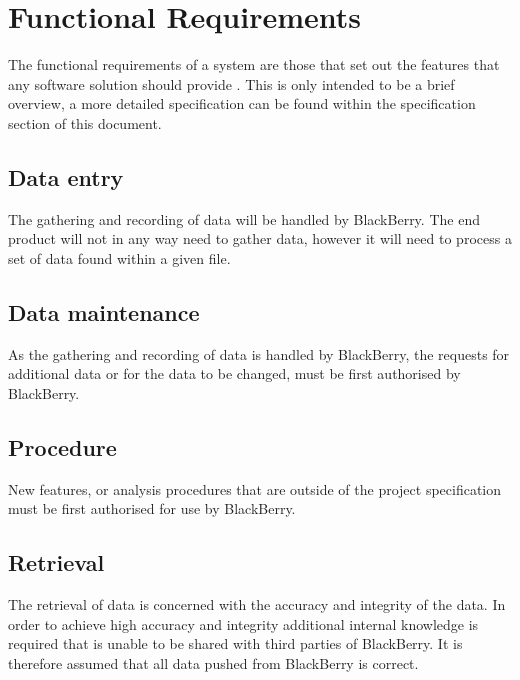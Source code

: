 \section{Functional Requirements}
The functional requirements of a system are those that set out the features 
that any software solution should provide \citep{cadle10}. This is only 
intended to be a brief overview, a more detailed specification can be found 
within the specification section of this document.

\subsection{Data entry}
The gathering and recording of data will be handled by BlackBerry. The end 
product will not in any way need to gather data, however it will need to 
process a set of data found within a given file.

\subsection{Data maintenance}
As the gathering and recording of data is handled by BlackBerry, the requests 
for additional data or for the data to be changed, must be first authorised by 
BlackBerry. 

\subsection{Procedure}
New features, or analysis procedures that are outside of the project 
specification must be first authorised for use by BlackBerry.

\subsection{Retrieval}
The retrieval of data is concerned with the accuracy and integrity of the data.
In order to achieve high accuracy and integrity additional internal knowledge 
is required that is unable to be shared with third parties of BlackBerry. It is
therefore assumed that all data pushed from BlackBerry is correct.